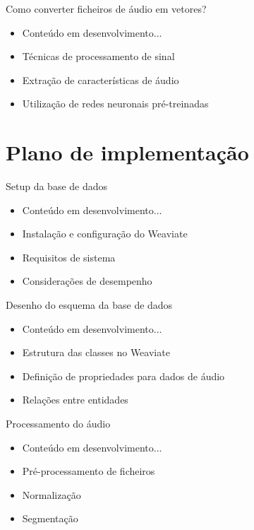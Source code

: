 \documentclass{beamer}
\begin{document}
\begin{frame}{Como converter ficheiros de áudio em vetores?}
    \begin{itemize}
        \item Conteúdo em desenvolvimento...
        \item Técnicas de processamento de sinal
        \item Extração de características de áudio
        \item Utilização de redes neuronais pré-treinadas
    \end{itemize}
\end{frame}

\section{Plano de implementação}

\begin{frame}{Setup da base de dados}
    \begin{itemize}
        \item Conteúdo em desenvolvimento...
        \item Instalação e configuração do Weaviate
        \item Requisitos de sistema
        \item Considerações de desempenho
    \end{itemize}
\end{frame}

\begin{frame}{Desenho do esquema da base de dados}
    \begin{itemize}
        \item Conteúdo em desenvolvimento...
        \item Estrutura das classes no Weaviate
        \item Definição de propriedades para dados de áudio
        \item Relações entre entidades
    \end{itemize}
\end{frame}

\begin{frame}{Processamento do áudio}
    \begin{itemize}
        \item Conteúdo em desenvolvimento...
        \item Pré-processamento de ficheiros
        \item Normalização
        \item Segmentação
    \end{itemize}
\end{frame}
\end{document}
